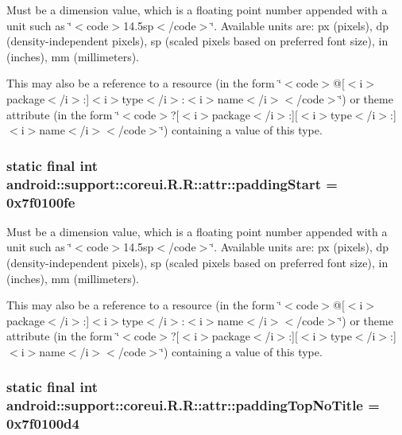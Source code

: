 Must be a dimension value, which is a floating point number appended with a unit such as \char`\"{}$<$code$>$14.5sp$<$/code$>$\char`\"{}. Available units are: px (pixels), dp (density-independent pixels), sp (scaled pixels based on preferred font size), in (inches), mm (millimeters). 

This may also be a reference to a resource (in the form \char`\"{}$<$code$>$@\mbox{[}$<$i$>$package$<$/i$>$:\mbox{]}$<$i$>$type$<$/i$>$:$<$i$>$name$<$/i$>$$<$/code$>$\char`\"{}) or theme attribute (in the form \char`\"{}$<$code$>$?\mbox{[}$<$i$>$package$<$/i$>$:\mbox{]}\mbox{[}$<$i$>$type$<$/i$>$:\mbox{]}$<$i$>$name$<$/i$>$$<$/code$>$\char`\"{}) containing a value of this type. \hypertarget{classandroid_1_1support_1_1coreui_1_1_r_1_1attr_48a35ffa8cc204251eeca0779079f029}{
\subsubsection[{paddingStart}]{\setlength{\rightskip}{0pt plus 5cm}static final int android::support::coreui.R.R::attr::paddingStart = 0x7f0100fe}}
\label{classandroid_1_1support_1_1coreui_1_1_r_1_1attr_48a35ffa8cc204251eeca0779079f029}


Must be a dimension value, which is a floating point number appended with a unit such as \char`\"{}$<$code$>$14.5sp$<$/code$>$\char`\"{}. Available units are: px (pixels), dp (density-independent pixels), sp (scaled pixels based on preferred font size), in (inches), mm (millimeters). 

This may also be a reference to a resource (in the form \char`\"{}$<$code$>$@\mbox{[}$<$i$>$package$<$/i$>$:\mbox{]}$<$i$>$type$<$/i$>$:$<$i$>$name$<$/i$>$$<$/code$>$\char`\"{}) or theme attribute (in the form \char`\"{}$<$code$>$?\mbox{[}$<$i$>$package$<$/i$>$:\mbox{]}\mbox{[}$<$i$>$type$<$/i$>$:\mbox{]}$<$i$>$name$<$/i$>$$<$/code$>$\char`\"{}) containing a value of this type. \hypertarget{classandroid_1_1support_1_1coreui_1_1_r_1_1attr_db822a0bf2b833d6b66ee4df4f7ddc89}{
\subsubsection[{paddingTopNoTitle}]{\setlength{\rightskip}{0pt plus 5cm}static final int android::support::coreui.R.R::attr::paddingTopNoTitle = 0x7f0100d4}}
\label{classandroid_1_1support_1_1coreui_1_1_r_1_1attr_db822a0bf2b833d6b66ee4df4f7ddc89}


